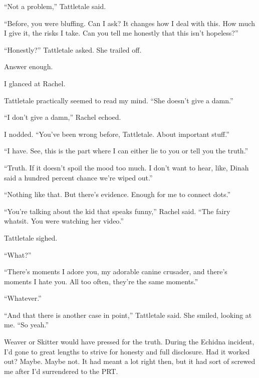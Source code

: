 ``Not a problem,'' Tattletale said.



``Before, you were bluffing.  Can I ask?  It changes how I deal with this.  How much I give it, the risks I take.  Can you tell me honestly that this isn't hopeless?''



``Honestly?''  Tattletale asked.  She trailed off.



Answer enough.



I glanced at Rachel.



Tattletale practically seemed to read my mind.  ``She doesn't give a damn.''



``I don't give a damn,'' Rachel echoed.



I nodded.  ``You've been wrong before, Tattletale.  About important stuff.''



``I have.  See, this is the part where I can either lie to you or tell you the truth.''



``Truth.  If it doesn't spoil the mood too much.  I don't want to hear, like, Dinah said a hundred percent chance we're wiped out.''



``Nothing like that.  But there's evidence.  Enough for me to connect dots.''



``You're talking about the kid that speaks funny,'' Rachel said.  ``The fairy whatsit.  You were watching her video.''



Tattletale sighed.



``What?''



``There's moments I adore you, my adorable canine crusader, and there's moments I hate you.  All too often, they're the same moments.''



``Whatever.''



``And that there is another case in point,'' Tattletale said.  She smiled, looking at me.  ``So yeah.''



Weaver or Skitter would have pressed for the truth.  During the Echidna incident, I'd gone to great lengths to strive for honesty and full disclosure.  Had it worked out?  Maybe.  Maybe not.  It had meant a lot right then, but it had sort of screwed me after I'd surrendered to the PRT.



